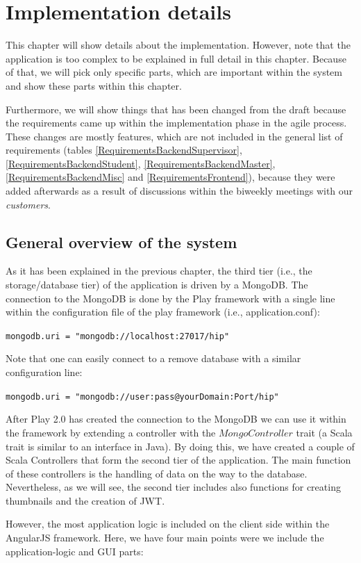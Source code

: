 \chapter[Implementation details]{Implementation details}
\label{implementation}
This chapter will show details about the implementation. However, note that the application is too complex to be explained in full detail in this chapter. Because of that, we will pick only specific parts, which are important within the system and show these parts within this chapter.

Furthermore, we will show things that has been changed from the draft because the requirements came up within the implementation phase in the agile process. These changes are mostly features, which are not included in the general list of requirements (tables \ref{RequirementsBackendSupervisor}, \ref{RequirementsBackendStudent}, \ref{RequirementsBackendMaster}, \ref{RequirementsBackendMisc} and \ref{RequirementsFrontend}), because they were added afterwards as a result of discussions within the biweekly meetings with our \emph{customers}.

\section{General overview of the system}
As it has been explained in the previous chapter, the third tier (i.e., the storage/database tier) of the application is driven by a MongoDB. The connection to the MongoDB is done by the Play framework with a single line within the configuration file of the play framework (i.e., application.conf):

\verb|mongodb.uri = "mongodb://localhost:27017/hip"|

Note that one can easily connect to a remove database with a similar configuration line:

\verb|mongodb.uri = "mongodb://user:pass@yourDomain:Port/hip"|  

After Play 2.0 has created the connection to the MongoDB we can use it within the framework by extending a controller with the $MongoController$ trait (a Scala trait is similar to an interface in Java). By doing this, we have created a couple of Scala Controllers that form the second tier of the application. The main function of these controllers is the handling of data on the way to the database. Nevertheless, as we will see, the second tier includes also functions for creating thumbnails and the creation of \ac{JWT}. 

However, the most application logic is included on the client side within the AngularJS framework. Here, we have four main points were we include the application-logic and \ac{GUI} parts:

